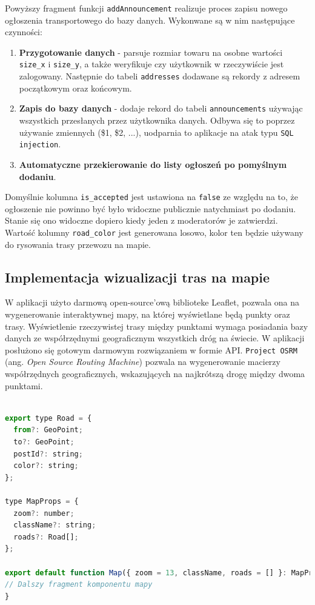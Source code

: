 \pagebreak
Powyższy fragment funkcji \texttt{addAnnouncement} realizuje proces zapisu nowego ogłoszenia transportowego do bazy danych. Wykonwane są w nim następujące czynności:
\begin{enumerate}
    \item \textbf{Przygotowanie danych} - parsuje rozmiar towaru na osobne wartości \texttt{size\_x} i \texttt{size\_y}, a także weryfikuje czy użytkownik w rzeczywiście jest zalogowany. Następnie do tabeli \texttt{addresses} dodawane są rekordy z adresem początkowym oraz końcowym.
    \item \textbf{Zapis do bazy danych} - dodaje rekord do tabeli \texttt{announcements} używając wszystkich przesłanych przez użytkownika danych. Odbywa się to poprzez używanie zmiennych (\$1, \$2, ...), uodparnia to aplikacje na atak typu \texttt{SQL injection}.
    \item \textbf{Automatyczne przekierowanie do listy ogłoszeń po pomyślnym dodaniu}.
\end{enumerate}
Domyślnie kolumna \texttt{is\_accepted} jest ustawiona na \texttt{false} ze względu na to, że ogłoszenie nie powinno być było widoczne publicznie natychmiast po dodaniu. Stanie się ono widoczne dopiero kiedy jeden z moderatorów je zatwierdzi. Wartość kolumny \texttt{road\_color} jest generowana losowo, kolor ten będzie używany do rysowania trasy przewozu na mapie.

\subsection{Implementacja wizualizacji tras na mapie}
W aplikacji użyto darmową open-source'ową biblioteke Leaflet, pozwala ona na wygenerowanie interaktywnej mapy, na której wyświetlane będą punkty oraz trasy. Wyświetlenie rzeczywistej trasy między punktami wymaga posiadania bazy danych ze współrzędnymi geograficznym wszystkich dróg na świecie. W aplikacji posłużono się gotowym darmowym rozwiązaniem w formie API. \texttt{Project OSRM} (ang. \emph{Open Source Routing Machine}) pozwala na wygenerowanie macierzy współrzędnych geograficznych, wskazujących na najkrótszą drogę między dwoma punktami.

{\belowcaptionskip=-9pt
\begin{lstlisting}[language=JavaScript,caption=Argumenty komponentu mapy, label=lst:mapProps]

export type Road = {
  from?: GeoPoint;
  to?: GeoPoint;
  postId?: string;
  color?: string;
};

type MapProps = {
  zoom?: number;
  className?: string;
  roads?: Road[];
};

export default function Map({ zoom = 13, className, roads = [] }: MapProps) {
// Dalszy fragment komponentu mapy
}
\end{lstlisting}
}


